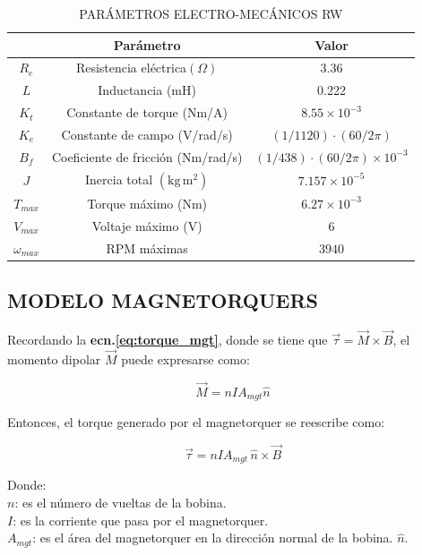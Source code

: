 \begin{table}[!ht]
	\caption{\MakeUppercase{Parámetros electro-mecánicos RW }}
	\begin{center}
		\begin{tabular}{ c c c}
			
			&  \textbf{Parámetro} &  \textbf{Valor}\\ \hline
			$R_e$ &  Resistencia eléctrica$(\Omega)$ & 3.36\\ 
			$L$ &  Inductancia (mH) & 0.222\\ 
			$K_t$ &  Constante de torque (Nm/A) & $8.55\times10^{-3}$ \\ 
			$K_e$ &  Constante de campo (V/rad/s)& $(1/1120)\cdot(60/2\pi)$ \\ 
			$B_f$ &  Coeficiente de fricción (Nm/rad/s)& $(1/438)\cdot(60/2\pi)\times10^{-3}$ \\
			$J$ &  Inercia total $\mathrm{(kg\,m^2)}$& $7.157\times10^{-5}$ \\  
			$T_{max}$ & Torque máximo (Nm) & $6.27\times10^{-3}$ \\
			$V_{max}$ & Voltaje máximo (V) & $6$ \\
			$\omega_{max}$ & RPM máximas & $3940$ \\ \hline
		\end{tabular}
	\end{center}
	\label{table:motorRW}
\end{table}
\clearpage
\subsection{MODELO MAGNETORQUERS}
Recordando la \textbf{ecn.\eqref{eq:torque_mgt}}, donde se tiene que $\vec{\tau} =\vec{M}\times\vec{B}$, el momento dipolar $\vec{M}$ puede expresarse como:

\begin{equation}\label{eq:momento_dipolar}
	\vec{M} = nIA_{mgt}\hat{n}	
\end{equation}

Entonces, el torque generado por el magnetorquer se reescribe como:

\begin{equation}\label{eq:momento_dipolar_completa}
	\vec{\tau} = nIA_{mgt}\,\hat{n}\times\vec{B}	
\end{equation}

\noindent Donde:\\
$n$: es el número de vueltas de la bobina.\\
$I$: es la corriente que pasa por el magnetorquer.\\
$A_{mgt}$: es el área del magnetorquer en la dirección normal de la bobina. $\hat{n}$.

